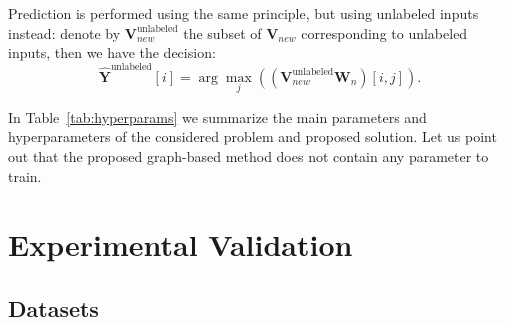 \documentclass[a4paper,conference]{IEEEtran}
\begin{document}
Prediction is performed using the same principle, but using unlabeled inputs instead: denote by $\mathbf{V}_{new}^{\text{unlabeled}}$ the subset of $\mathbf{V}_{new}$ corresponding to unlabeled inputs, then we have the decision:
\begin{equation}
    \hat{\mathbf{Y}}^{\text{unlabeled}}[i] = \arg\max_j((\mathbf{V}_{new}^{\text{unlabeled}}\mathbf{W}_n)[i,j]).
\end{equation}

In Table~\ref{tab:hyperparams} we summarize the main parameters and hyperparameters of the considered problem and proposed solution. Let us point out that the proposed graph-based method does not contain any parameter to train.

\begin{table}[h]
    \caption{Parameters and hyperparameters of the considered problem and proposed solution (\# stands for ``number'').}
    \centering
    \label{tab:hyperparams}
\end{table}

\section{Experimental Validation}
\label{sec:exp}
\subsection{Datasets}
\end{document}
